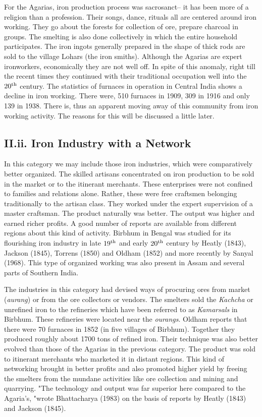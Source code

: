 For the Agarias, iron production process was sacrosanct– it has been more of a religion than a profession. Their songs, dance, rituals all are centered around iron working.  They go about the forests for collection of ore, prepare charcoal in groups.  The smelting is also done collectively in which the entire household participates.  The iron ingots generally prepared in the shape of thick rods are sold to the village Lohars (the iron smiths). Although the Agarias are expert ironworkers, economically they are not well off.  In spite of this anomaly, right till the recent times they continued with their traditional occupation well into the $20^{\rm th}$ century. The statistics of furnaces in operation in Central India shows a decline in iron working. There were, 510 furnaces in 1909, 309 in 1916 and only 139 in 1938.  There is, thus an apparent moving away of this community from iron working activity. The reasons for this will be discussed a little later. 

\subsection*{II.ii.   Iron Industry with a Network}\label{subsection-2}

In this category we may include those iron industries, which were comparatively better organized.  The skilled artisans concentrated on iron production to be sold in the market or to the itinerant merchants.  These enterprises were not confined to families and relations alone.  Rather, these were free craftsmen belonging traditionally to the artisan class.  They worked under the expert supervision of a master craftsman.  The product naturally was better. The output was higher and earned richer profits.  A good number of reports are available from different regions about this kind of activity. Birbhum in Bengal was studied for its flourishing iron industry in late $19^{\rm th}$ and early $20^{\rm th}$ century by Heatly (1843), Jackson (1845), Torrens (1850) and Oldham (1852) and more recently by Sanyal (1968). This type of organized working was also present in Assam and several parts of Southern India.

The industries in this category had devised ways of procuring ores from market ({\it aurang}) or from the ore collectors or vendors.  The smelters sold the {\it Kachcha} or unrefined iron to the refineries which have been referred to as {\it Kamarsals} in Birbhum.  These refineries were located near the {\it ourangs}.  Oldham reports that there were 70 furnaces in 1852 (in five villages of Birbhum).  Together they produced roughly about 1700 tons of refined iron.  Their technique was also better evolved than those of the Agarias in the previous category.  The product was sold to itinerant merchants who marketed it in distant regions. This kind of networking brought in better profits and also promoted higher yield by freeing the smelters from the mundane activities like ore collection and mining and quarrying. "The technology and output was far superior here compared to the Agaria's, "wrote Bhattacharya (1983) on the basis of reports by Heatly (1843) and Jackson (1845).  

